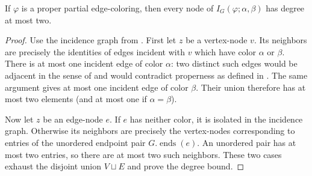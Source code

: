 \begin{lemma}
If $\varphi$ is a proper partial edge-coloring, then every node of
$I_G(\varphi;\alpha,\beta)$ has degree at most two.
\end{lemma}
\begin{proof}
Use the incidence graph from .  First let
$z$ be a vertex-node $v$.  Its neighbors are precisely the identities of
edges incident with $v$ which have color $\alpha$ or $\beta$.  There is at
most one incident edge of color $\alpha$: two distinct such edges would be
adjacent in the sense of  and would contradict
properness as defined in .  The same argument
gives at most one incident edge of color $\beta$.  Their union therefore
has at most two elements (and at most one if $\alpha=\beta$).

Now let $z$ be an edge-node $e$.  If $e$ has neither color, it is isolated
in the incidence graph.  Otherwise its neighbors are precisely the
vertex-nodes corresponding to entries of the unordered endpoint pair
$G.\operatorname{ends}(e)$.  An unordered pair has at most two entries, so
there are at most two such neighbors.  These two cases exhaust the disjoint
union $V\sqcup E$ and prove the degree bound.
\end{proof}
